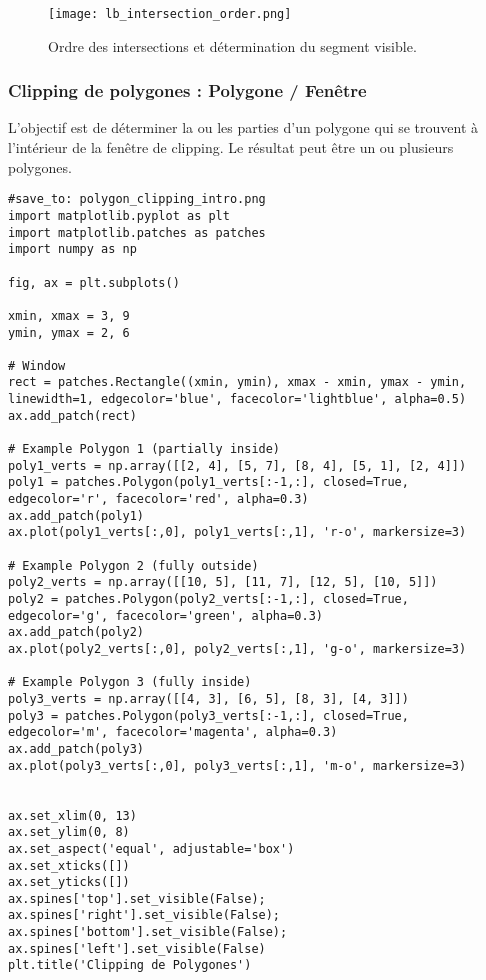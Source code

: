 \documentclass{article}
\begin{document}
{\begin{figure}[H]
\centering
\texttt{[image: lb\_intersection\_order.png]}
\caption{Ordre des intersections et détermination du segment visible.}
\label{fig:lb_intersection_order}
\end{figure}


\subsubsection{Clipping de polygones : Polygone / Fenêtre}
L'objectif est de déterminer la ou les parties d'un polygone qui se trouvent à l'intérieur de la fenêtre de clipping. Le résultat peut être un ou plusieurs polygones.

\begin{verbatim}
#save_to: polygon_clipping_intro.png
import matplotlib.pyplot as plt
import matplotlib.patches as patches
import numpy as np

fig, ax = plt.subplots()

xmin, xmax = 3, 9
ymin, ymax = 2, 6

# Window
rect = patches.Rectangle((xmin, ymin), xmax - xmin, ymax - ymin, linewidth=1, edgecolor='blue', facecolor='lightblue', alpha=0.5)
ax.add_patch(rect)

# Example Polygon 1 (partially inside)
poly1_verts = np.array([[2, 4], [5, 7], [8, 4], [5, 1], [2, 4]])
poly1 = patches.Polygon(poly1_verts[:-1,:], closed=True, edgecolor='r', facecolor='red', alpha=0.3)
ax.add_patch(poly1)
ax.plot(poly1_verts[:,0], poly1_verts[:,1], 'r-o', markersize=3)

# Example Polygon 2 (fully outside)
poly2_verts = np.array([[10, 5], [11, 7], [12, 5], [10, 5]])
poly2 = patches.Polygon(poly2_verts[:-1,:], closed=True, edgecolor='g', facecolor='green', alpha=0.3)
ax.add_patch(poly2)
ax.plot(poly2_verts[:,0], poly2_verts[:,1], 'g-o', markersize=3)

# Example Polygon 3 (fully inside)
poly3_verts = np.array([[4, 3], [6, 5], [8, 3], [4, 3]])
poly3 = patches.Polygon(poly3_verts[:-1,:], closed=True, edgecolor='m', facecolor='magenta', alpha=0.3)
ax.add_patch(poly3)
ax.plot(poly3_verts[:,0], poly3_verts[:,1], 'm-o', markersize=3)


ax.set_xlim(0, 13)
ax.set_ylim(0, 8)
ax.set_aspect('equal', adjustable='box')
ax.set_xticks([])
ax.set_yticks([])
ax.spines['top'].set_visible(False); ax.spines['right'].set_visible(False); ax.spines['bottom'].set_visible(False); ax.spines['left'].set_visible(False)
plt.title('Clipping de Polygones')


\end{verbatim}}
\end{document}
